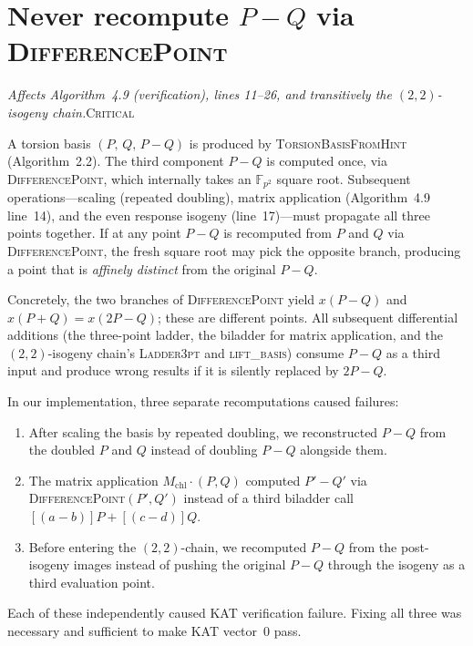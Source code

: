 \documentclass[a4paper,11pt]{article}
\newcommand{\algo}[1]{Algorithm~#1}
\newcommand{\Fpii}{\mathbb{F}_{p^2}}
\newcommand{\critical}{\textsc{\color{BrickRed}Critical}}
\newcommand{\finding}[2]{\noindent\textit{#1}\hfill#2\par\smallskip}
\begin{document}
\section{Never recompute $P{-}Q$ via \textsc{DifferencePoint}}
\label{sec:pmq-recompute}

\finding{Affects \algo{4.9} (verification), lines 11--26,
and transitively the $(2,2)$-isogeny chain.}{\critical}

A torsion basis $(P,\, Q,\, P{-}Q)$ is produced by
\textsc{TorsionBasisFromHint} (\algo{2.2}).  The third component
$P{-}Q$ is computed once, via \textsc{DifferencePoint}, which
internally takes an $\Fpii$ square root.  Subsequent operations---scaling
(repeated doubling), matrix application (\algo{4.9} line~14), and the
even response isogeny (line~17)---must propagate all three points
together.  If at any point $P{-}Q$ is recomputed from $P$ and $Q$ via
\textsc{DifferencePoint}, the fresh square root may pick the opposite
branch, producing a point that is \emph{affinely distinct} from the
original $P{-}Q$.

Concretely, the two branches of \textsc{DifferencePoint} yield $x(P-Q)$
and $x(P+Q) = x(2P-Q)$; these are different points.  All subsequent
differential additions (the three-point ladder, the biladder for matrix
application, and the $(2,2)$-isogeny chain's \textsc{Ladder3pt} and
\textsc{lift\_basis}) consume $P{-}Q$ as a third input and produce wrong
results if it is silently replaced by $2P{-}Q$.

In our implementation, three separate recomputations caused failures:
\begin{enumerate}[nosep]
  \item After scaling the basis by repeated doubling, we reconstructed
        $P{-}Q$ from the doubled $P$ and $Q$ instead of doubling $P{-}Q$
        alongside them.
  \item The matrix application $M_{\mathrm{chl}} \cdot (P, Q)$ computed
        $P' - Q'$ via \textsc{DifferencePoint}$(P', Q')$ instead of a
        third biladder call $[(a{-}b)]P + [(c{-}d)]Q$.
  \item Before entering the $(2,2)$-chain, we recomputed
        $P{-}Q$ from the post-isogeny images instead of pushing the
        original $P{-}Q$ through the isogeny as a third evaluation point.
\end{enumerate}
Each of these independently caused KAT verification failure.  Fixing all
three was necessary and sufficient to make KAT vector~0 pass.
\end{document}
